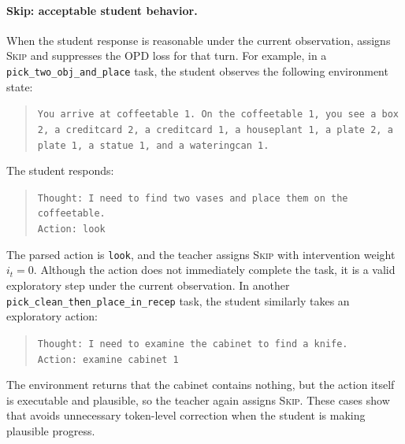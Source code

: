 \paragraph{Skip: acceptable student behavior.}
When the student response is reasonable under the current observation, \ours{} assigns \textsc{Skip} and suppresses the OPD loss for that turn.
%
For example, in a \texttt{pick\_two\_obj\_and\_place} task, the student observes the following environment state:
%
\begin{quote}
\small
\texttt{You arrive at coffeetable 1. On the coffeetable 1, you see a box 2, a creditcard 2, a creditcard 1, a houseplant 1, a plate 2, a plate 1, a statue 1, and a wateringcan 1.}
\end{quote}
%
The student responds:
%
\begin{quote}
\small
\texttt{Thought: I need to find two vases and place them on the coffeetable.}\\
\texttt{Action: look}
\end{quote}
%
The parsed action is \texttt{look}, and the teacher assigns \textsc{Skip} with intervention weight $i_t=0$.
%
Although the action does not immediately complete the task, it is a valid exploratory step under the current observation.
%
In another \texttt{pick\_clean\_then\_place\_in\_recep} task, the student similarly takes an exploratory action:
%
\begin{quote}
\small
\texttt{Thought: I need to examine the cabinet to find a knife.}\\
\texttt{Action: examine cabinet 1}
\end{quote}
%
The environment returns that the cabinet contains nothing, but the action itself is executable and plausible, so the teacher again assigns \textsc{Skip}.
%
These cases show that \ours{} avoids unnecessary token-level correction when the student is making plausible progress.

